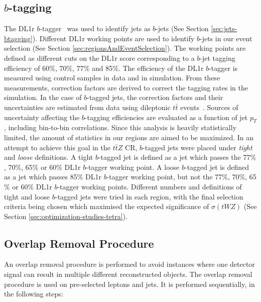 \subsection{$b$-tagging}
The DL1r $b$-tagger~\cite{DL1r-paper} was used to identify jets as $b$-jets (See Section \ref{sec:jets-btagging}). Different DL1r working points are used to identify $b$-jets in our event selection (See Section \ref{sec:regionsAndEventSelection}). The working points are defined as different cuts on the DL1r score corresponding to a $b$-jet tagging efficiency of 60$\%$, 70$\%$, 77$\%$ and 85$\%$. The efficiency of the DL1r $b$-tagger is measured using control samples in data and in simulation. From these measurements, correction factors are derived to correct the tagging rates in the simulation. In the case of $b$-tagged jets, the correction factors and
their uncertainties are estimated from data using dileptonic $t\bar{t}$ events~\cite{PERF-2016-05,FTAG-2018-01}. Sources of uncertainty affecting the $b$-tagging efficiencies are evaluated as a function of jet $p_{T}$, including bin-to-bin correlations. Since this analysis is heavily statistically limited, the amount of statistics in our regions are aimed to be maximized. In an attempt to achieve this goal in the $t\bar{t}Z$ CR, $b$-tagged jets were placed under \textit{tight} and \textit{loose} definitions. A tight $b$-tagged jet is defined as a jet which passes the 77$\%$, 70$\%$, 65$\%$ or 60$\%$ DL1r $b$-tagger working point. A loose $b$-tagged jet is defined as a jet which passes 85$\%$ DL1r $b$-tagger working point, but not the 77$\%$, 70$\%$, 65$\%$ or 60$\%$ DL1r $b$-tagger working points. Different numbers and definitions of tight and loose $b$-tagged jets were tried in each region, with the final selection criteria being chosen which maximised the expected significance of $\sigma(tWZ)$ (See Section \ref{sec:optimization-studies-tetra}).

\subsection{Overlap Removal Procedure}
\label{sec:overlap-removal-procedure}

An overlap removal procedure is performed to avoid instances where one detector signal can result in multiple different reconstructed objects. The overlap removal procedure is used on pre-selected leptons and jets. It is performed sequentially, in the following steps:

